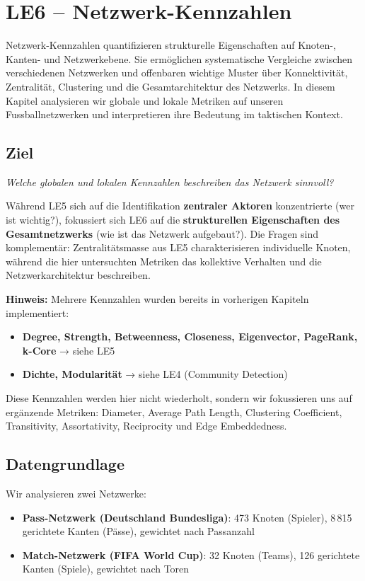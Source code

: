 \section{LE6 -- Netzwerk-Kennzahlen}

Netzwerk-Kennzahlen quantifizieren strukturelle Eigenschaften auf Knoten-, Kanten- und Netzwerkebene. Sie ermöglichen systematische Vergleiche zwischen verschiedenen Netzwerken und offenbaren wichtige Muster über Konnektivität, Zentralität, Clustering und die Gesamtarchitektur des Netzwerks. In diesem Kapitel analysieren wir globale und lokale Metriken auf unseren Fussballnetzwerken und interpretieren ihre Bedeutung im taktischen Kontext.

\subsection{Ziel}
\textit{Welche globalen und lokalen Kennzahlen beschreiben das Netzwerk sinnvoll?}

Während LE5 sich auf die Identifikation \textbf{zentraler Aktoren} konzentrierte (wer ist wichtig?), fokussiert sich LE6 auf die \textbf{strukturellen Eigenschaften des Gesamtnetzwerks} (wie ist das Netzwerk aufgebaut?). Die Fragen sind komplementär: Zentralitätsmasse aus LE5 charakterisieren individuelle Knoten, während die hier untersuchten Metriken das kollektive Verhalten und die Netzwerkarchitektur beschreiben.

\textbf{Hinweis:} Mehrere Kennzahlen wurden bereits in vorherigen Kapiteln implementiert:
\begin{itemize}
  \item \textbf{Degree, Strength, Betweenness, Closeness, Eigenvector, PageRank, k-Core} → siehe LE5
  \item \textbf{Dichte, Modularität} → siehe LE4 (Community Detection)
\end{itemize}

Diese Kennzahlen werden hier nicht wiederholt, sondern wir fokussieren uns auf ergänzende Metriken: Diameter, Average Path Length, Clustering Coefficient, Transitivity, Assortativity, Reciprocity und Edge Embeddedness.

\subsection{Datengrundlage}

Wir analysieren zwei Netzwerke:
\begin{itemize}
  \item \textbf{Pass-Netzwerk (Deutschland Bundesliga)}: 473 Knoten (Spieler), 8\,815 gerichtete Kanten (Pässe), gewichtet nach Passanzahl
  \item \textbf{Match-Netzwerk (FIFA World Cup)}: 32 Knoten (Teams), 126 gerichtete Kanten (Spiele), gewichtet nach Toren
\end{itemize}

